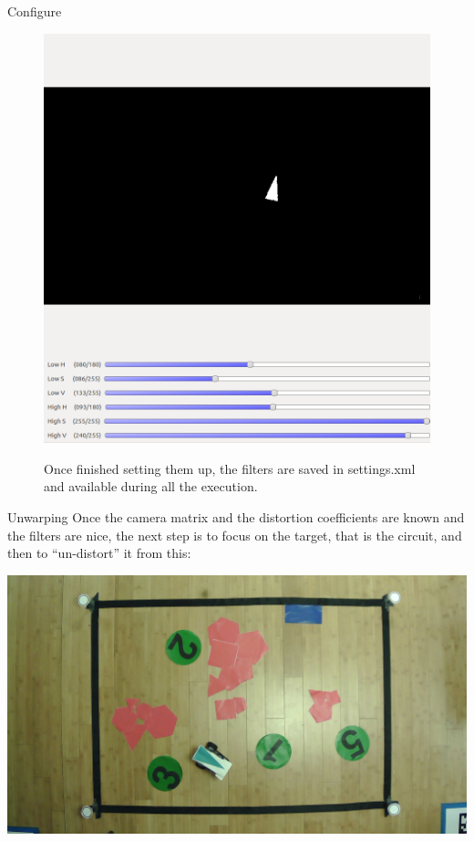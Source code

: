 \begin{frame}[fragile]{Configure}
\begin{figure}[H]
	\begin{minipage}{0.48\linewidth}
		\includegraphics[width=\linewidth]{Immagini/filterRobot}
	\end{minipage}
	\vspace{0.07\linewidth}
	\begin{minipage}{0.45\linewidth}
		Once finished setting them up, the filters are saved in settings.xml and available during all the execution.
	\end{minipage}
\end{figure}
\end{frame}

\begin{frame}[fragile]{Unwarping}
Once the camera matrix and the distortion coefficients are known and the filters are nice, the next step is to focus on the target, that is the circuit, and then to “un-distort” it from this: 
	\begin{center}
		\includegraphics[scale=0.145]{Immagini/UNUndistort}
	\end{center}
\end{frame}

